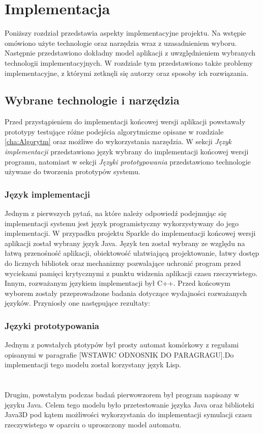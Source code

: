 ﻿\chapter {Implementacja}
\label{cha:implementacja}
Poniższy rozdział przedstawia aspekty implementacyjne projektu. Na wstępie omówiono użyte technologie oraz narzędzia wraz z uzasadnieniem wyboru. Następnie przedstawiono dokładny model aplikacji z uwzględnieniem wybranych technologii implementacyjnych. 
W rozdziale tym przedstawiono także problemy implementacyjne, z którymi zetknęli się autorzy oraz sposoby ich rozwiązania.
\section {Wybrane technologie i narzędzia}
Przed przystąpieniem do implementacji końcowej wersji aplikacji powstawały prototypy testujące różne podejścia algorytmiczne opisane w rozdziale \ref{cha:Algorytm} oraz możliwe do wykorzystania narzędzia. W sekcji \textit{Język implementacji} przedstawiono język wybrany do implementacji końcowej wersji programu, natomiast w sekcji \textit{Języki prototypowania} przedstawiono technologie używane do tworzenia prototypów systemu.
\subsection{Język implementacji}
Jednym z pierwszych pytań, na które należy odpowiedź podejmując się implementacji systemu jest język programistyczny wykorzystywany do jego implementacji. W przypadku projektu Sparkle do implementacji końcowej wersji aplikacji został wybrany język Java.
Język ten został wybrany ze względu na łatwą przenośność aplikacji, obiektowość ułatwiającą projektowanie, łatwy dostęp do licznych 
bibliotek oraz mechanizmy pozwalające uchronić program przed wyciekami pamięci krytycznymi z punktu widzenia aplikacji czasu rzeczywistego. Innym, rozważanym językiem implementacji był C++. Przed końcowym wyborem zostały przeprowadzone badania dotyczące wydajności rozważanych języków. Przyniosły one następujące rezultaty:
\begin{itemize}

\end{itemize}

\subsection{Języki prototypowania}
Jednym z powstałych ptotypów był prosty automat komórkowy z regułami opisanymi w paragrafie [WSTAWIC ODNOSNIK DO PARAGRAGU].Do implementacji tego modelu został korzystany język Lisp.
\\\\
[TUTAJ WSTAWIC ZALETY LISPA DO PROTOTYPOWANIA - WYMYSLISZ COS PRAWDA :>?]
\\
Drugim, powstałym podczas badań pierwowzorem był program napisany w języku Java.
Celem tego modelu było przetestowanie języka Java oraz biblioteki Java3D pod kątem możliwości wykorzystania do implementacji symulacji czasu rzeczywistego w oparciu o uproszczony model automatu. 

